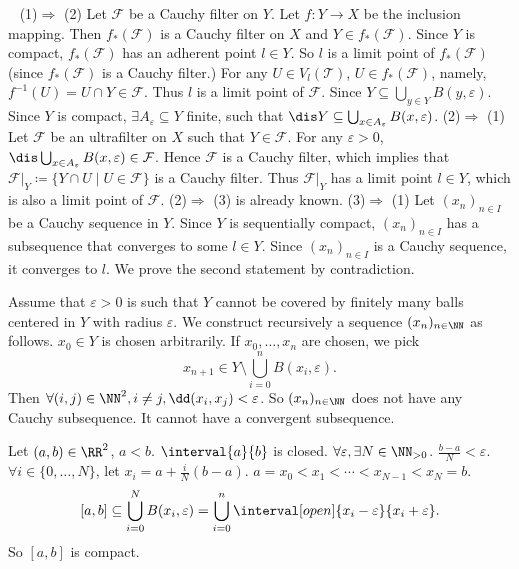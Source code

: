 \begin{proofenv}
    \ \newline
    (1)$\Rightarrow$ (2) Let $\mathcal{F}$ be a Cauchy filter on $Y$. Let $f:Y\longrightarrow X$ be the inclusion mapping. Then $f_*(\mathcal{F})$ is a Cauchy filter on $X$ and $Y\in f_*(\mathcal{F})$. Since $Y$ is compact, $f_*(\mathcal{F})$ has an adherent point $l\in Y$. So $l$ is a limit point of $f_*(\mathcal{F})$ (since $f_*(\mathcal{F})$ is a Cauchy filter.) For any $U\in V_{l}(\mathscr{T})$, $U\in f_*(\mathcal{F})$, namely, $f^{-1}(U)=U\cap Y\in \mathcal{F}$. Thus $l$ is a limit point of $\mathcal{F}$. Since $Y\subseteq \bigcup_{y\in Y}B(y,\varepsilon)$. Since $Y$ is compact, $\exists A_\varepsilon\subseteq Y$ finite, such that $\dis Y\subseteq \bigcup_{x\in A_\varepsilon}B(x,\varepsilon)$.
    \newline
    (2)$\Rightarrow$ (1) Let $\mathcal{F}$ be an ultrafilter on $X$ such that $Y\in \mathcal{F}$. For any $\varepsilon>0$, $\dis\bigcup_{x\in A_\varepsilon}B(x,\varepsilon)\in \mathcal{F}$. Hence $\mathcal{F}$ is a Cauchy filter, which implies that $\mathcal{F}|_Y\coloneq\{Y\cap U\mid U\in \mathcal{F}\}$ is a Cauchy filter. Thus $\mathcal{F}|_Y$ has a limit point $l\in Y$, which is also a limit point of $\mathcal{F}$.
    \newline
    (2)$\Rightarrow$ (3) is already known.
    \newline
    (3)$\Rightarrow$ (1) Let $(x_n)_{n\in I}$ be a Cauchy sequence in $Y$. Since $Y$ is sequentially compact, $(x_n)_{n\in I}$ has a subsequence that converges to some $l\in Y$. Since $(x_n)_{n\in I}$ is a Cauchy sequence, it converges to $l$. We prove the second statement by contradiction. 
    
    \quad Assume that $\varepsilon>0$ is such that $Y$ cannot be covered by finitely many balls centered in $Y$ with radius $\varepsilon$. We construct recursively a sequence $(x_n)_{n\in\NN}$ as follows. $x_0\in Y$ is chosen arbitrarily. If $x_0,\ldots,x_n$ are chosen, we pick 
    $$x_{n+1}\in Y\setminus \bigcup_{i=0}^{n}B(x_i,\varepsilon).$$
    Then $\forall(i,j)\in \NN^2, i\neq j, \dd(x_i,x_j)<\varepsilon$. So $(x_n)_{n\in \NN}$ does not have any Cauchy subsequence. It cannot have a convergent subsequence.
\end{proofenv}
\begin{exampleenv}
    Let $(a,b)\in \RR^2$, $a<b$. $\interval{a}{b}$ is closed. $\forall \varepsilon, \exists N\in \NN_{>0}$. $\frac{b-a}{N}<\varepsilon$. $\forall i\in \{0,\ldots, N\}$, let $x_i=a+\frac{i}{N}(b-a)$. $a=x_0<x_1<\cdots<x_{N-1}<x_N=b$. 
    $$[a,b]\subseteq\bigcup_{i=0}^{N}B(x_i,\varepsilon)=\bigcup_{i=0}^{n}\interval[open]{x_i-\varepsilon}{x_{i}+\varepsilon}.$$
    So $[a,b]$ is compact.
\end{exampleenv}
